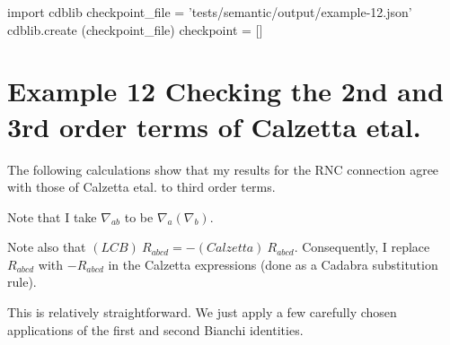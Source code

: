 \documentclass[12pt]{cdblatex}
\begin{document}
\bgroup
{}
\begin{cadabra}
   import cdblib
   checkpoint_file = 'tests/semantic/output/example-12.json'
   cdblib.create (checkpoint_file)
   checkpoint = []
\end{cadabra}
\egroup

\clearpage

\section*{Example 12 Checking the 2nd and 3rd order terms of Calzetta etal.}

The following calculations show that my results for the RNC connection agree with those of Calzetta etal. to third order terms.

Note that I take $\nabla_{ab}$ to be $\nabla_a\left(\nabla_b\right)$.

Note also that $(LCB)\>R_{abcd} = - (Calzetta)\> R_{abcd}$. Consequently, I replace $R_{abcd}$ with
$-R_{abcd}$ in the Calzetta expressions (done as a Cadabra substitution rule).

This is relatively straightforward. We just apply a few carefully chosen applications of the first and second Bianchi identities.

\clearpage
\end{document}
